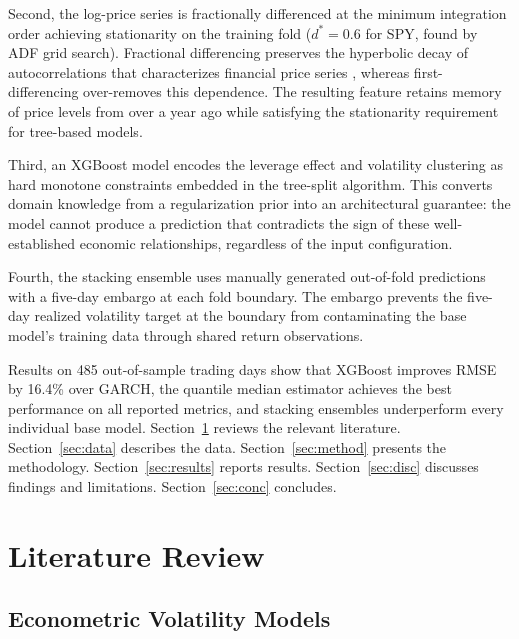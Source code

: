 \documentclass[12pt]{article}
\begin{document}
Second, the log-price series is fractionally differenced at the minimum
integration order achieving stationarity on the training fold ($d^{*} = 0.6$
for SPY, found by ADF grid search).  Fractional differencing preserves the
hyperbolic decay of autocorrelations that characterizes financial price series
\citep{GrangerJoyeux1980}, whereas first-differencing over-removes this
dependence.  The resulting feature retains memory of price levels from over a
year ago while satisfying the stationarity requirement for tree-based models.

Third, an XGBoost model encodes the leverage effect \citep{Black1976} and
volatility clustering as hard monotone constraints embedded in the tree-split
algorithm.  This converts domain knowledge from a regularization prior into an
architectural guarantee: the model cannot produce a prediction that contradicts
the sign of these well-established economic relationships, regardless of the
input configuration.

Fourth, the stacking ensemble uses manually generated out-of-fold predictions
with a five-day embargo at each fold boundary.  The embargo prevents the
five-day realized volatility target at the boundary from contaminating the
base model's training data through shared return observations.

Results on 485 out-of-sample trading days show that XGBoost improves RMSE by
16.4\% over GARCH, the quantile median estimator achieves the best performance
on all reported metrics, and stacking ensembles underperform every individual
base model.  Section~\ref{sec:lit} reviews the relevant literature.
Section~\ref{sec:data} describes the data.  Section~\ref{sec:method} presents
the methodology.  Section~\ref{sec:results} reports results.
Section~\ref{sec:disc} discusses findings and limitations.
Section~\ref{sec:conc} concludes.


\section{Literature Review}
\label{sec:lit}

\subsection*{Econometric Volatility Models}
\end{document}
